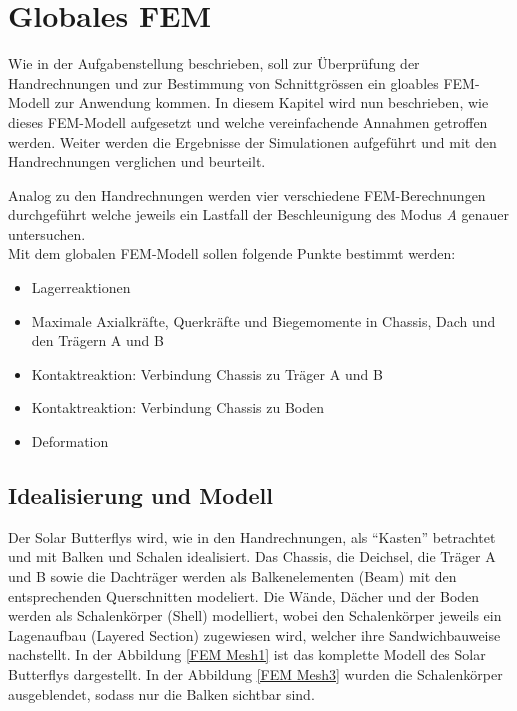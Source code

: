 \section{Globales FEM}
Wie in der Aufgabenstellung beschrieben, soll zur Überprüfung der Handrechnungen und zur Bestimmung von Schnittgrössen ein gloables FEM-Modell zur Anwendung kommen. In diesem Kapitel wird nun beschrieben, wie dieses FEM-Modell aufgesetzt und welche vereinfachende Annahmen getroffen werden. Weiter werden die Ergebnisse der Simulationen aufgeführt und mit den Handrechnungen verglichen und beurteilt.


Analog zu den Handrechnungen werden vier verschiedene FEM-Berechnungen durchgeführt welche jeweils ein Lastfall der Beschleunigung des Modus \emph{A} genauer untersuchen.\\

Mit dem globalen FEM-Modell sollen folgende Punkte bestimmt werden:
\begin{itemize}
  \item Lagerreaktionen
  \item Maximale Axialkräfte, Querkräfte und Biegemomente in Chassis, Dach und den Trägern A und B
  \item Kontaktreaktion: Verbindung Chassis zu Träger A und B
  \item Kontaktreaktion: Verbindung Chassis zu Boden
  \item Deformation
\end{itemize}

\subsection{Idealisierung und Modell}
Der Solar Butterflys wird, wie in den Handrechnungen, als ``Kasten'' betrachtet und mit Balken und Schalen idealisiert. Das Chassis, die Deichsel, die Träger A und B sowie die Dachträger werden als Balkenelementen (Beam) mit den entsprechenden Querschnitten modeliert. Die Wände, Dächer und der Boden werden als Schalenkörper (Shell) modelliert, wobei den Schalenkörper jeweils ein Lagenaufbau (Layered Section) zugewiesen wird, welcher ihre Sandwichbauweise nachstellt. In der Abbildung \ref{FEM Mesh1} ist das komplette Modell des Solar Butterflys dargestellt. In der Abbildung \ref{FEM Mesh3} wurden die Schalenkörper ausgeblendet, sodass nur die Balken sichtbar sind.

